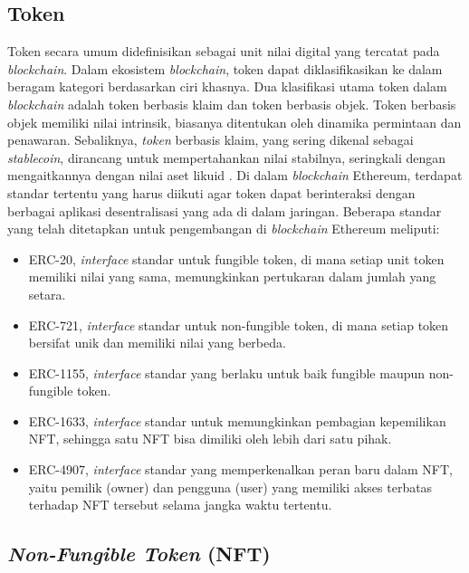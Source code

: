 \subsection{Token}
Token secara umum didefinisikan sebagai unit nilai digital yang tercatat pada \emph{blockchain}. Dalam ekosistem \emph{blockchain}, token dapat diklasifikasikan ke dalam beragam kategori berdasarkan ciri khasnya. Dua klasifikasi utama token dalam \emph{blockchain} adalah token berbasis klaim dan token berbasis objek. Token berbasis objek memiliki nilai intrinsik, biasanya ditentukan oleh dinamika permintaan dan penawaran. Sebaliknya, \emph{token} berbasis klaim, yang sering dikenal sebagai \emph{stablecoin}, dirancang untuk mempertahankan nilai stabilnya, seringkali dengan mengaitkannya dengan nilai aset likuid \cite{Freni2022}. 
Di dalam \emph{blockchain} Ethereum, terdapat standar tertentu yang harus diikuti agar token dapat berinteraksi dengan berbagai aplikasi desentralisasi yang ada di dalam jaringan. Beberapa standar yang telah ditetapkan untuk pengembangan di \emph{blockchain} Ethereum meliputi:
\begin{itemize}
    \item ERC-20, \emph{interface} standar untuk fungible token, di mana setiap unit token memiliki nilai yang sama, memungkinkan pertukaran dalam jumlah yang setara.
    \item ERC-721, \emph{interface} standar untuk non-fungible token, di mana setiap token bersifat unik dan memiliki nilai yang berbeda.
    \item ERC-1155, \emph{interface} standar yang berlaku untuk baik fungible maupun non-fungible token.
    \item ERC-1633, \emph{interface} standar untuk memungkinkan pembagian kepemilikan NFT, sehingga satu NFT bisa dimiliki oleh lebih dari satu pihak.
    \item ERC-4907, \emph{interface} standar yang memperkenalkan peran baru dalam NFT, yaitu pemilik (owner) dan pengguna (user) yang memiliki akses terbatas terhadap NFT tersebut selama jangka waktu tertentu.
\end{itemize}

\subsection{\emph{Non-Fungible Token} (NFT)}

